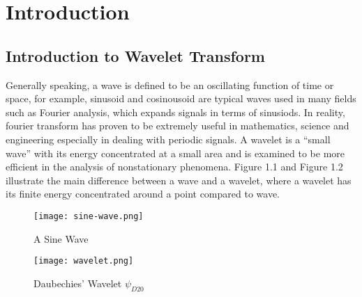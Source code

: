 \chapter{Introduction} %

\label{Chapter1} %



\section{Introduction to Wavelet Transform}

Generally speaking, a wave is defined to be an oscillating function of time or space, for example, sinusoid and cosinousoid are typical waves used in many fields such as Fourier analysis, which expands signals in terms of sinusiods. In reality, fourier transform has proven to be extremely useful in mathematics, science and engineering especially in dealing with periodic signals. A wavelet is a ``small wave'' with its energy concentrated at a small area and is examined to be more efficient in the analysis of nonstationary phenomena. Figure 1.1 and Figure 1.2 illustrate the main difference between a wave and a wavelet, where a wavelet has its finite energy concentrated around a point compared to wave.
 \begin{figure}[htb]
  \centering
  \begin{minipage}[c]{0.5\textwidth}
\centering
  \texttt{[image: sine-wave.png]}
  \caption{A Sine Wave}
\end{minipage}%
\begin{minipage}[c]{0.5\textwidth}
\centering
  \texttt{[image: wavelet.png]}
  \caption{Daubechies' Wavelet $\psi_{D20}$}
  \end{minipage}

\end{figure}


